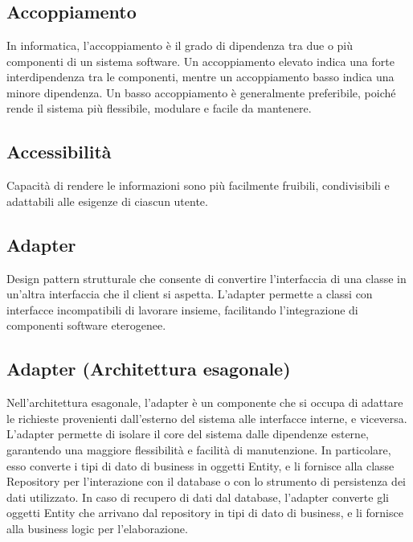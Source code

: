 \appendix %



\section{}

\hypertarget{sec:accoppiamento}{}
\subsection*{Accoppiamento}
In informatica, l'accoppiamento è il grado di dipendenza tra due o più componenti di un sistema software. Un accoppiamento elevato indica una forte
interdipendenza tra le componenti, mentre un accoppiamento basso indica una minore dipendenza. Un basso accoppiamento è generalmente preferibile, poiché
rende il sistema più flessibile, modulare e facile da mantenere.

\hypertarget{sec:accessibilità}{}
\subsection*{Accessibilità}
Capacità di rendere le informazioni sono più facilmente fruibili, condivisibili e adattabili alle esigenze di ciascun utente.

\hypertarget{sec:adapter}{}
\subsection*{Adapter}
Design pattern strutturale che consente di convertire l'interfaccia di una classe in un'altra interfaccia che il client si aspetta.
L'adapter permette a classi con interfacce incompatibili di lavorare insieme, facilitando l'integrazione di componenti software eterogenee.

\hypertarget{sec_adapter_arch_esagonale}{}
\subsection*{Adapter (Architettura esagonale)}
Nell'architettura esagonale, l'adapter è un componente che si occupa di adattare le richieste provenienti dall'esterno del sistema alle interfacce interne,
e viceversa. L'adapter permette di isolare il core del sistema dalle dipendenze esterne, garantendo una maggiore flessibilità e facilità di manutenzione.
In particolare, esso converte i tipi di dato di business in oggetti Entity, e li fornisce alla classe Repository per l'interazione con il database o con
lo strumento di persistenza dei dati utilizzato. In caso di recupero di dati dal database, l'adapter converte gli oggetti Entity che
arrivano dal repository in tipi di dato di business, e li fornisce alla business logic per l'elaborazione.

